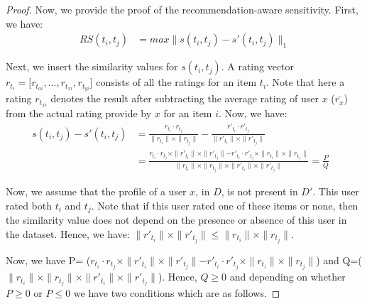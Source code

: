 \documentclass[11pt]{article}
\theoremstyle{plain}
\theoremstyle{definition}
\begin{document}
\begin{proof}
Now, we provide the proof of the recommendation-aware sensitivity. First, we have:
\begin{align*}
RS(t_i, t_j) &= 
max \parallel s(t_i, t_j) - s'(t_i, t_j)\parallel_1
\end{align*}

Next, we insert the similarity values for $s(t_i, t_j)$. A rating vector $r_{t_i} = \lbrack r_{t_{ai}}, ..., r_{t_{xi}}, r_{t_{yi}} \rbrack$ consists of all the ratings for an item $t_i$. Note that here a rating $r_{t_{xi}}$ denotes the result after subtracting the average rating of user $x$ ($\bar{r_x}$) from the actual rating provide by $x$ for an item $i$. Now, we have:
\begin{align*}
 s(t_i, t_j) - s'(t_i, t_j) &= \frac{r_{t_i} \cdot r_{t_j}}{\parallel r_{t_i} \parallel \times \parallel r_{t_j} \parallel} - 
\frac{r'_{t_i} \cdot r'_{t_j}}{\parallel r'_{t_i} \parallel \times \parallel r'_{t_j} \parallel} \\
& =\frac{r_{t_i} \cdot r_{t_j} \times \parallel r'_{t_i} \parallel \times \parallel r'_{t_j} \parallel -
r'_{t_i} \cdot r'_{t_j} \times \parallel r_{t_i} \parallel \times \parallel r_{t_j} \parallel 
}{\parallel r_{t_i} \parallel \times \parallel r_{t_j} \parallel \times \parallel r'_{t_i} \parallel \times \parallel r'_{t_j} \parallel}=\frac{P}{Q} &
\end{align*}

Now, we assume that the profile of a user $x$, in $D$, is not present in $D'$. This user rated both $t_i$ and $t_j$. Note that if this user rated one of these items or none, then the similarity value does not depend on the presence or absence of this user in the dataset. Hence, we have: $\parallel r'_{t_i} \parallel \times \parallel r'_{t_j} \parallel \leq \parallel r_{t_i} \parallel \times \parallel r_{t_j} \parallel$. 

Now, we have P= ($r_{t_i} \cdot r_{t_j} \times \parallel r'_{t_i} \parallel \times \parallel r'_{t_j} \parallel -
r'_{t_i} \cdot r'_{t_j} \times \parallel r_{t_i} \parallel \times \parallel r_{t_j} \parallel$) and Q=($\parallel r_{t_i} \parallel \times \parallel r_{t_j} \parallel \times \parallel r'_{t_i} \parallel \times \parallel r'_{t_j} \parallel$).
Hence, $Q \geq 0$ and depending on whether $P \geq 0$ or $P \leq 0$ we have two conditions which are as follows.


\end{proof}
\end{document}
